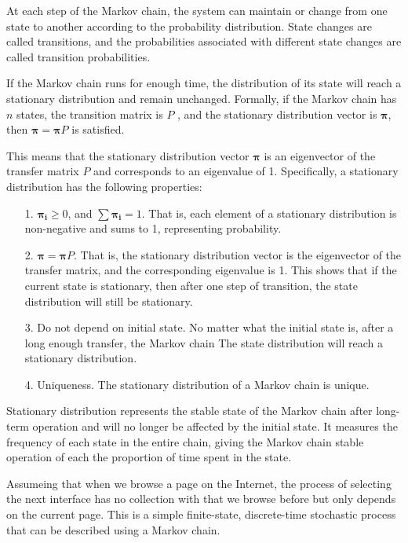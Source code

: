 \documentclass[lettersize,journal,12pt]{IEEEtran}
\begin{document}
At each step of the Markov chain, the system can maintain or change from one state to another according to the probability distribution. State changes are called transitions, and the probabilities associated with different state changes are called transition probabilities.

If the Markov chain runs for enough time, the distribution of its state will reach a stationary distribution and remain unchanged. Formally, if the Markov chain has $n$ states, the transition matrix is $P$
, and the stationary distribution vector is $\boldsymbol{\pi}$, then $\boldsymbol{\pi} = \boldsymbol{\pi} P$ is satisfied.

This means that the stationary distribution vector $\boldsymbol{\pi}$ is an eigenvector of the transfer matrix $P$ and corresponds to an eigenvalue of 1. Specifically, a stationary distribution has the following properties:
\begin{enumerate}
	\item [1.] $\boldsymbol{\pi_i}\geq0$, and $\sum\boldsymbol{\pi_i}=1$. That is, each element of a stationary distribution is non-negative and sums to 1, representing probability.
	\item [2.] $\boldsymbol{\pi} = \boldsymbol{\pi} P$. That is, the stationary distribution vector is the eigenvector of the transfer matrix, and the corresponding eigenvalue is 1. This shows that if the current state is stationary, then after one step of transition, the state distribution will still be stationary.
	\item [3.] Do not depend on initial state. No matter what the initial state is, after a long enough transfer, the Markov chain
	      The state distribution will reach a stationary distribution.
	\item [4.] Uniqueness. The stationary distribution of a Markov chain is unique.
\end{enumerate}

Stationary distribution represents the stable state of the Markov chain after long-term operation and will no longer be affected by the initial state.
It measures the frequency of each state in the entire chain, giving the Markov chain stable operation of each
the proportion of time spent in the state.

Assumeing that when we browse a page on the Internet, the process of selecting the next interface has no collection with that we browse before but only depends on the current page. This is a simple finite-state, discrete-time stochastic process that can be described using a Markov chain.
\end{document}
